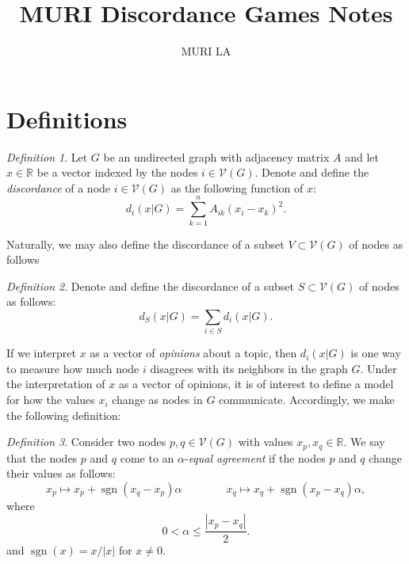 \documentclass{article}
\title{MURI Discordance Games Notes}
\author{MURI LA}
\theoremstyle{remark}
\newtheorem{definition}{Definition}
\newcommand{\R}[0]{\mathbb{R}}
\DeclareMathOperator{\sgn}{sgn}
\begin{document}
	\maketitle
	\section{Definitions}

\begin{definition}{\label{defn:discordanceOfNode}}
Let $G$ be an undirected graph with adjacency matrix $A$ and let $x\in\R$ be a vector indexed by the nodes $i\in\mathcal{V}(G)$. Denote and define the \textit{discordance} of a node $i\in\mathcal{V}(G)$ as the following function of $x$:
	\begin{equation*}
	d_i(x|G) = \sum_{k=1}^nA_{ik}(x_i-x_k)^2.
	\end{equation*}
\end{definition}
Naturally, we may also define the discordance of a subset $V\subset\mathcal{V}(G)$ of nodes as follows
\begin{definition}{\label{defn:discordanceOfSet}}
Denote and define the discordance of a subset $S\subset\mathcal{V}(G)$ of nodes as follows:
	\begin{equation*}
	d_S(x|G) = \sum_{i\in S}d_i(x|G).
	\end{equation*}
\end{definition}
If we interpret $x$ as a vector of \textit{opinions} about a topic, then $d_i(x|G)$ is one way to measure how much node $i$ disagrees with its neighbors in the graph $G$. Under the interpretation of $x$ as a vector of opinions, it is of interest to define a model for how the values $x_i$ change as nodes in $G$ communicate. Accordingly, we make the following definition: 

\begin{definition}{\label{defn:alphaEqualAgreement}}
Consider two nodes $p,q\in\mathcal{V}(G)$ with values $x_p,x_q\in\R$. We say that the nodes $p$ and $q$ come to an $\alpha$-\textit{equal agreement} if the nodes $p$ and $q$ change their values as follows:
	\begin{equation*}
	x_p\mapsto x_p+\sgn(x_q-x_p)\alpha\qquad\qquad x_q\mapsto x_q+\sgn(x_p-x_q)\alpha, 
	\end{equation*}
where
	\begin{equation*}
	0<\alpha\leq\frac{|x_p-x_q|}{2}.
	\end{equation*}
and $\sgn(x)=x/|x|$ for $x\neq 0$.
\end{definition}
\end{document}
